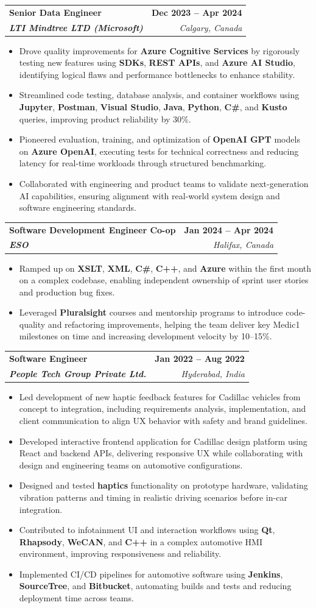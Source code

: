 \documentclass[letterpaper,11pt]{article}
\makeatletter
\newcommand{\resumeItem}[1]{
  \item\small{
    {#1 \vspace{-2pt}}
  }
}
\newcommand{\resumeSubheading}[4]{
  \vspace{-2pt}\item
    \begin{tabular*}{1.0\textwidth}[t]{l@{\extracolsep{\fill}}r}
      \textbf{#1} & \textbf{\small #2} \\
      \textit{\small#3} & \textit{\small #4} \\
    \end{tabular*}\vspace{-7pt}
}
\newcommand{\resumeItemListStart}{\begin{itemize}}
\newcommand{\resumeItemListEnd}{\end{itemize}\vspace{-5pt}}
\makeatother
\begin{document}
    \resumeSubheading
      {\textbf{Senior Data Engineer}}{\textbf{Dec 2023 -- Apr 2024}}
      {\textbf{LTI Mindtree LTD (Microsoft)}}{Calgary, Canada}
      \resumeItemListStart
        \resumeItem{Drove quality improvements for \textbf{Azure Cognitive Services} by rigorously testing new features using \textbf{SDKs}, \textbf{REST APIs}, and \textbf{Azure AI Studio}, identifying logical flaws and performance bottlenecks to enhance stability.}
        \resumeItem{Streamlined code testing, database analysis, and container workflows using \textbf{Jupyter}, \textbf{Postman}, \textbf{Visual Studio}, \textbf{Java}, \textbf{Python}, \textbf{C\#}, and \textbf{Kusto} queries, improving product reliability by 30\%.}
        \resumeItem{Pioneered evaluation, training, and optimization of \textbf{OpenAI GPT} models on \textbf{Azure OpenAI}, executing tests for technical correctness and reducing latency for real-time workloads through structured benchmarking.}
        \resumeItem{Collaborated with engineering and product teams to validate next-generation AI capabilities, ensuring alignment with real-world system design and software engineering standards.}
      \resumeItemListEnd
    
    \resumeSubheading
      {\textbf{Software Development Engineer Co-op}}{\textbf{Jan 2024 -- Apr 2024}}
      {\textbf{ESO}}{Halifax, Canada}
      \resumeItemListStart
        \resumeItem{Ramped up on \textbf{XSLT}, \textbf{XML}, \textbf{C\#}, \textbf{C++}, and \textbf{Azure} within the first month on a complex codebase, enabling independent ownership of sprint user stories and production bug fixes.}
        \resumeItem{Leveraged \textbf{Pluralsight} courses and mentorship programs to introduce code-quality and refactoring improvements, helping the team deliver key Medic1 milestones on time and increasing development velocity by 10--15\%.}
      \resumeItemListEnd

    \resumeSubheading
      {\textbf{Software Engineer}}{\textbf{Jan 2022 -- Aug 2022}}
      {\textbf{People Tech Group Private Ltd.}}{Hyderabad, India}
      \resumeItemListStart
        \resumeItem{Led development of new haptic feedback features for Cadillac vehicles from concept to integration, including requirements analysis, implementation, and client communication to align UX behavior with safety and brand guidelines.}
        \resumeItem{Developed interactive frontend application for Cadillac design platform using React and backend APIs, delivering responsive UX while collaborating with design and engineering teams on automotive configurations.}
        \resumeItem{Designed and tested \textbf{haptics} functionality on prototype hardware, validating vibration patterns and timing in realistic driving scenarios before in-car integration.}
        \resumeItem{Contributed to infotainment UI and interaction workflows using \textbf{Qt}, \textbf{Rhapsody}, \textbf{WeCAN}, and \textbf{C++} in a complex automotive HMI environment, improving responsiveness and reliability.}
        \resumeItem{Implemented CI/CD pipelines for automotive software using \textbf{Jenkins}, \textbf{SourceTree}, and \textbf{Bitbucket}, automating builds and tests and reducing deployment time across teams.}
      \resumeItemListEnd
\end{document}
